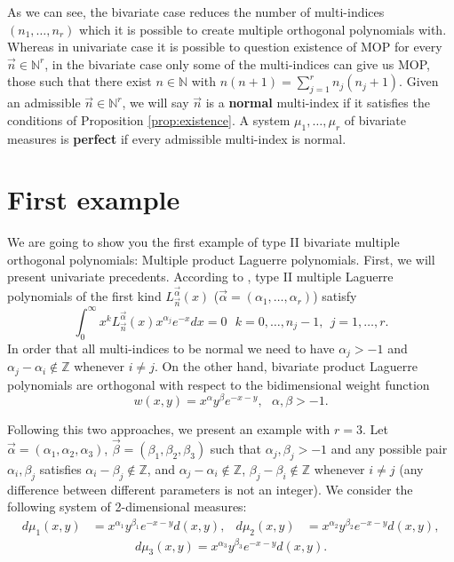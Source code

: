 \documentclass[12pt,a4]{report}
\theoremstyle{plain}
\newcommand{\N}[0]{\mathbb{N}}
\newcommand{\Z}[0]{\mathbb{Z}}
\begin{document}
As we can see, the bivariate case reduces the number of multi-indices $(n_1,\dots,n_r)$ which it is possible to create multiple orthogonal polynomials with. Whereas in univariate case it is possible to question existence of MOP for every $\vec n\in \N^r$, in the bivariate case only some of the multi-indices can give us MOP, those such that there exist $n\in\N$ with $n(n+1)=\displaystyle\sum_{j=1}^r n_j (n_j+1)$. Given an admissible $\vec n\in\N^r$, we will say $\vec n$ is a \textbf{normal} multi-index if it satisfies the conditions of Proposition \ref{prop:existence}. A system $\mu_1,\dots,\mu_r$ of bivariate measures is \textbf{perfect} if every admissible multi-index is normal.

\section{First example}

We are going to show you the first example of type II bivariate multiple orthogonal polynomials: Multiple product Laguerre polynomials. First, we will present univariate precedents. According to \cite[Page 658, Section 3.6.1]{foupouagnigni-2020}, type II multiple Laguerre polynomials of the first kind $L_{\vec n}^{\vec\alpha}(x)$ ($\vec\alpha=(\alpha_1,\dots,\alpha_r)$) satisfy
\begin{equation}
    \int_0^\infty x^k L_{\vec n}^{\vec\alpha}(x) x^{\alpha_j} e^{-x} dx =0 \ \ \ k=0,\dots, n_j-1, \ \ j=1,\dots,r. 
\end{equation}
In order that all multi-indices to be normal we need to have $\alpha_j>-1$ and $\alpha_j- \alpha_i\not\in\Z$ whenever $i\neq j$. On the other hand, bivariate product Laguerre polynomials \cite[Ch. II, Section 2.2]{dunkl_xu_2014} are orthogonal with respect to the bidimensional weight function
$$w(x,y)=x^\alpha y^\beta e^{-x-y}, \ \ \ \alpha,\beta>-1.$$ 

Following this two approaches, we present an example with $r=3$. Let $\vec\alpha=(\alpha_1,\alpha_2,\alpha_3)$, $\vec\beta=(\beta_1,\beta_2,\beta_3)$ such that $\alpha_j,\beta_j > -1$ and any possible pair $\alpha_i,\beta_j$ satisfies $\alpha_i-\beta_j\not\in\Z$, and  $\alpha_j- \alpha_i\not\in\Z$, $\beta_j- \beta_i\not\in\Z$ whenever $i\neq j$ (any difference between different parameters is not an integer). We consider the following system of 2-dimensional measures:
\begin{align}
    d\mu_1(x,y) &= x^{\alpha_1} y^{\beta_1} e^{-x-y} d(x,y), & d\mu_2(x,y) &= x^{\alpha_2} y^{\beta_2} e^{-x-y} d(x,y),
\end{align}
$$d\mu_3(x,y) = x^{\alpha_3} y^{\beta_3} e^{-x-y} d(x,y).$$
\end{document}
